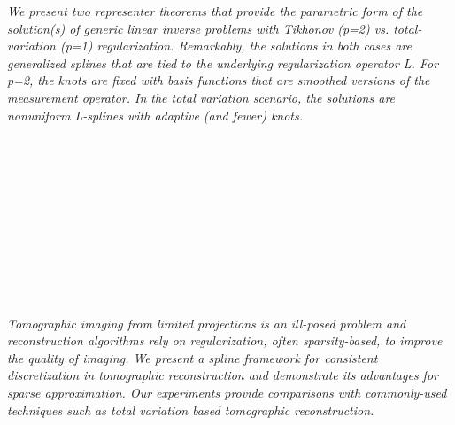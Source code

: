   \begin{multicols}{2}
      \textit{We present two representer theorems that provide the parametric form of the solution(s) of generic linear inverse problems with Tikhonov (p=2) vs. total-variation (p=1) regularization. Remarkably, the solutions in both cases are generalized splines that are tied to the underlying regularization operator L. For p=2, the knots are fixed with basis functions that are smoothed versions of the measurement operator. In the total variation scenario, the solutions are nonuniform L-splines with adaptive (and fewer) knots.}\\
\\ 
        \\
        \\\\
        \\
        \\\\
        \\
        \\\\
\\
      \textit{Tomographic imaging from limited projections is an ill-posed problem and reconstruction algorithms rely on regularization, often sparsity-based, to improve the quality of imaging. We present a spline framework for consistent discretization in tomographic reconstruction and demonstrate its advantages for sparse approximation. Our experiments provide comparisons with commonly-used techniques such as total variation based tomographic reconstruction.}\\
\\ 
        \\
        \\\\
        \\
        \\\\
        \\
        \\\\
\\
      \textit{}\\
\\ 
        \\

\end{multicols}
